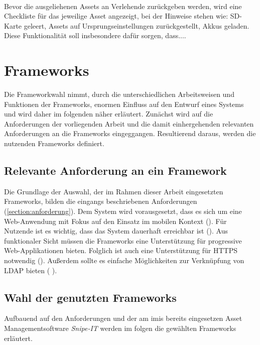     {\sffamily\color{maincolor}{Ft-A-7 | Rückgabe-Checkliste}}\\
Bevor die ausgeliehenen Assets an Verlehende zurückgeben werden, wird eine
Checkliste für das jeweilige Asset angezeigt, bei der Hinweise stehen wie:
SD-Karte geleert, Assets auf Ursprungseinstellungen zurückgestellt, Akkus
geladen. Diese Funktionalität soll insbesondere dafür sorgen, dass....

\section{Frameworks}
\label{section:frameworks}
Die Frameworkwahl nimmt, durch die unterschiedlichen Arbeitsweisen und Funktionen
der Frameworks, enormen Einfluss auf den Entwurf eines Systems und wird daher im
folgenden näher erläutert. Zunächst wird auf die Anforderungen der vorliegenden
Arbeit und die damit einhergehenden relevanten Anforderungen an die Frameworks
eingeggangen. Resultierend daraus, werden die nutzenden Frameworks definiert.

\subsection{Relevante Anforderung an ein Framework}
Die Grundlage der Auswahl, der im Rahmen dieser Arbeit eingesetzten Frameworks,
bilden die eingangs beschriebenen Anforderungen (\ref{section:anforderung}). Dem
System wird vorausgesetzt, dass es sich um eine Web-Anwendung mit Fokus auf den
Einsatz im mobilen Kontext (). Für Nutzende ist es
wichtig, dass das System dauerhaft erreichbar ist (). Aus
funktionaler Sicht müssen die Frameworks eine Unterstützung für progressive
Web-Applikationen bieten. Folglich ist auch eine Unterstützung für HTTPS
notwendig (). Außerdem sollte es einfache Möglichkeiten zur
Verknüpfung von LDAP bieten ( ).

\subsection{Wahl der genutzten Frameworks}
Aufbauend auf den Anforderungen und der am \ac{imis} bereits eingesetzen Asset
Managementsoftware \textit{Snipe-IT} werden im folgen die gewählten Frameworks
erläutert.

